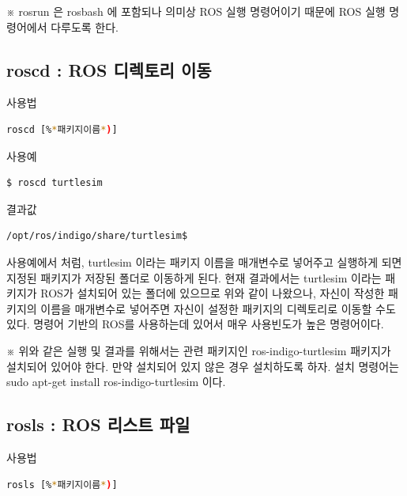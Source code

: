 \noindent
※ rosrun 은 rosbash 에 포함되나 의미상 ROS 실행 명령어이기 때문에 ROS 실행 명령어에서 다루도록 한다.

\subsection{roscd : ROS 디렉토리 이동}

\setcounter{num}{0}

\circled{\thenum} 사용법
\begin{lstlisting}[language=bash]
roscd [%*패키지이름*)]
\end{lstlisting}

\noindent
{}\circled{\thenum} 사용예
\begin{lstlisting}[language=bash]
$ roscd turtlesim
\end{lstlisting}

\noindent
{}\circled{\thenum} 결과값
\begin{lstlisting}[language=bash]
/opt/ros/indigo/share/turtlesim$
\end{lstlisting}

\vspace{\baselineskip}
\noindent
사용예에서 처럼, turtlesim 이라는 패키지 이름을 매개변수로 넣어주고 실행하게 되면 지정된 패키지가 저장된 폴더로 이동하게 된다. 현재 결과에서는 turtlesim 이라는 패키지가 ROS가 설치되어 있는 폴더에 있으므로 위와 같이 나왔으나, 자신이 작성한 패키지의 이름을 매개변수로 넣어주면 자신이 설정한 패키지의 디렉토리로 이동할 수도 있다. 명령어 기반의 ROS를 사용하는데 있어서 매우 사용빈도가 높은 명령어이다.

\vspace{\baselineskip}
\noindent
※ 위와 같은 실행 및 결과를 위해서는 관련 패키지인 ros-indigo-turtlesim 패키지가 설치되어 있어야 한다. 만약 설치되어 있지 않은 경우 설치하도록 하자. 설치 명령어는 sudo apt-get install ros-indigo-turtlesim  이다.

\subsection{rosls : ROS 리스트 파일}

\setcounter{num}{0}

\circled{\thenum} 사용법
\begin{lstlisting}[language=bash]
rosls [%*패키지이름*)]
\end{lstlisting}

